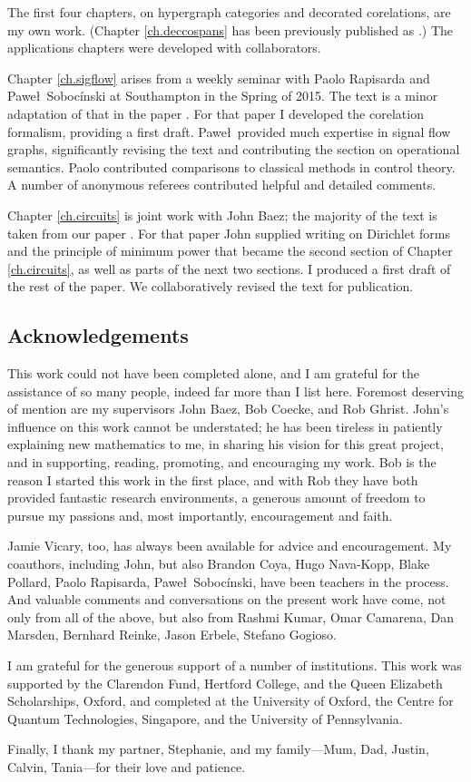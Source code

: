 The first four chapters, on hypergraph categories and decorated corelations, are
my own work. (Chapter \ref{ch.deccospans} has been previously published as
\cite{Fon15}.) The applications chapters were developed with collaborators. 

Chapter \ref{ch.sigflow} arises from a weekly seminar with Paolo Rapisarda and
Pawe\l\ Soboc\'inski at Southampton in the Spring of 2015. The text is a minor
adaptation of that in the paper \cite{FRS16}. For that paper I developed the
corelation formalism, providing a first draft. Pawe\l\ provided much expertise
in signal flow graphs, significantly revising the text and contributing the
section on operational semantics. Paolo contributed comparisons to classical
methods in control theory.  A number of anonymous referees contributed helpful
and detailed comments.

Chapter \ref{ch.circuits} is joint work with John Baez; the majority of the text
is taken from our paper \cite{BF}. For that paper John supplied writing on
Dirichlet forms and the principle of minimum power that became the second
section of Chapter \ref{ch.circuits}, as well as parts of the next two sections.
I produced a first draft of the rest of the paper. We collaboratively revised
the text for publication.

\subsection*{Acknowledgements}
This work could not have been completed alone, and I am grateful for the
assistance of so many people, indeed far more than I list here. Foremost
deserving of mention are my supervisors John Baez, Bob Coecke, and Rob Ghrist.
John's influence on this work cannot be understated; he has been tireless in
patiently explaining new mathematics to me, in sharing his vision for this great
project, and in supporting, reading, promoting, and encouraging my work. Bob is
the reason I started this work in the first place, and with Rob they have both
provided fantastic research environments, a generous amount of freedom to pursue
my passions and, most importantly, encouragement and faith.

Jamie Vicary, too, has always been available for advice and encouragement. My
coauthors, including John, but also Brandon Coya, Hugo Nava-Kopp, Blake Pollard,
Paolo Rapisarda, Pawe\l\ Soboc\'inski, have been teachers in the process.
And valuable comments and conversations on the present work have come, not only
from all of the above, but also from Rashmi Kumar, Omar Camarena, Dan Marsden,
Bernhard Reinke, Jason Erbele, Stefano Gogioso.

I am grateful for the generous support of a number of institutions.  This work
was supported by the Clarendon Fund, Hertford College, and the Queen Elizabeth
Scholarships, Oxford, and completed at the University of Oxford, the Centre for
Quantum Technologies, Singapore, and the University of Pennsylvania.

Finally, I thank my partner, Stephanie, and my family---Mum, Dad, Justin,
Calvin, Tania---for their love and patience.

